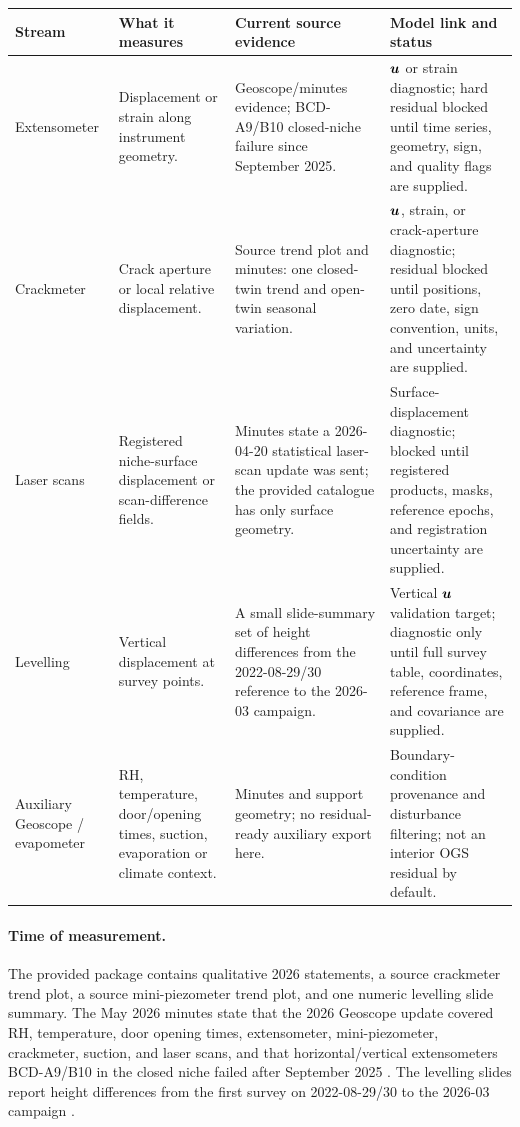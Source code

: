 \begin{center}
\centering
\footnotesize
\renewcommand{\arraystretch}{1.12}
\label{tab:other-hm-status}
\begin{tabular}{@{}L{0.18\textwidth} L{0.25\textwidth} L{0.24\textwidth} L{0.23\textwidth}@{}}
\toprule
Stream & What it measures & Current source evidence & Model link and status\\
\midrule
Extensometer & Displacement or strain along instrument geometry. &
Geoscope/minutes evidence; BCD-A9/B10 closed-niche failure since September 2025. &
\(\bm{u}\) or strain diagnostic; hard residual blocked until time series, geometry,
sign, and quality flags are supplied.\\
Crackmeter & Crack aperture or local relative displacement. &
Source trend plot and minutes: one closed-twin trend and open-twin seasonal
variation. &
\(\bm{u}\), strain, or crack-aperture diagnostic; residual blocked until positions,
zero date, sign convention, units, and uncertainty are supplied.\\
Laser scans & Registered niche-surface displacement or scan-difference fields. &
Minutes state a 2026-04-20 statistical laser-scan update was sent; the provided catalogue
has only surface geometry. &
Surface-displacement diagnostic; blocked until registered products, masks,
reference epochs, and registration uncertainty are supplied.\\
Levelling & Vertical displacement at survey points. &
A small slide-summary set of height differences from the 2022-08-29/30 reference
to the 2026-03 campaign. &
Vertical \(\bm{u}\) validation target; diagnostic only until full survey table,
coordinates, reference frame, and covariance are supplied.\\
Auxiliary Geoscope / evapometer & RH, temperature, door/opening times, suction,
evaporation or climate context. &
Minutes and support geometry; no residual-ready auxiliary export here. &
Boundary-condition provenance and disturbance filtering; not an interior OGS
residual by default.\\
\bottomrule
\end{tabular}
\end{center}

\paragraph{Time of measurement.}
The provided package contains qualitative 2026 statements, a source crackmeter trend
plot, a source mini-piezometer trend plot, and one numeric levelling slide summary.
The May 2026 minutes state that the 2026 Geoscope update covered RH, temperature,
door opening times, extensometer, mini-piezometer, crackmeter, suction, and laser
scans, and that horizontal/vertical extensometers BCD-A9/B10 in the closed niche
failed after September 2025 \citep[PDF p.~4]{CDATDMinutes2026Email}.  The levelling
slides report height differences from the first survey on 2022-08-29/30 to the
2026-03 campaign \citep[PDF pp.~2, 5]{Levelling2026Email}.

